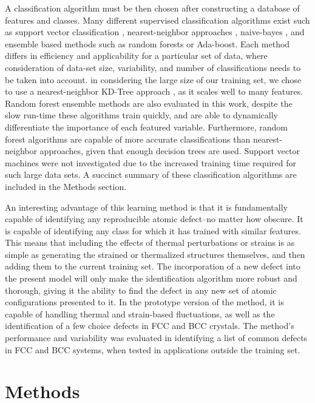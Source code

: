 \documentclass[12pt]{iopart}
\begin{document}
A classification algorithm must be then chosen after constructing a database of features and classes. Many different supervised classification algorithms exist such as support vector classification \cite{Smola2004}, nearest-neighbor approaches \cite{Bentley1975, Omohundro1989}, naive-bayes \cite{Zhang2004}, and ensemble based methods such as random forests \cite{Breiman2001} or Ada-boost\cite{Zhu2009}. Each method differs in efficiency and applicability for a particular set of data, where consideration of data-set size, variability, and number of classifications needs to be taken into account. in considering the large size of our training set, we chose to use a nearest-neighbor KD-Tree approach \cite{Bentley1975}, as it scales well to many features. Random forest ensemble methods\cite{Breiman2001} are also evaluated in this work, despite the slow run-time these algorithms train quickly, and are able to dynamically differentiate the importance of each featured variable. Furthermore, random forest algorithms are capable of more accurate classifications than nearest-neighbor approaches, given that enough decision trees are used. Support vector machines were not investigated due to the increased training time required for such large data sets. A succinct summary of these classification algorithms are included in the Methods section.

An interesting advantage of this learning method is that it is fundamentally capable of identifying any reproducible atomic defect--no matter how obscure. It is capable of identifying any class for which it has trained with similar features. This means that including the effects of thermal perturbations or strains is as simple as generating the strained or thermalized structures themselves, and then adding them to the current training set. The incorporation of a new defect into the present model will only make the identification algorithm more robust and thorough, giving it the ability to find the defect in any new set of atomic configurations presented to it. In the prototype version of the method, it is capable of handling thermal and strain-based fluctuations, as well as the identification of a few choice defects in FCC and BCC crystals. The method's performance and variability was evaluated in identifying a list of common defects in FCC and BCC systems, when tested in applications outside the training set.

\section{Methods}
\end{document}
